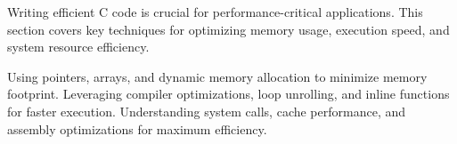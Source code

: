 \begin{comment}
9.5.1.2 Compiler-Driven Optimizations

9.5.2 Cache Alignment for Peak Performance

9.5.2.1 Memory Access and Predictability

9.5.2.2 Struct Packing Strategies

9.6 C17 and Beyond – Future Optimization Techniques
9.6.1 Link-Time Optimization (LTO)

9.6.1.1 Optimizing Across Multiple Source Files

9.6.1.2 Removing Unused Functions at Compile-Time

9.6.2 The Future of Low-Level Optimization

9.6.2.1 AI-Assisted Performance Profiling

9.6.2.2 Safer High-Performance Programming
\end{comment}

\begin{NxSBox}[][Optimization in C]
	\begin{NxIDBox}
		Writing efficient C code is crucial for performance-critical applications. This section covers key techniques for optimizing memory usage, execution speed, and system resource efficiency.
	\end{NxIDBox}
	\begin{NxIDBoxL}
		 Using pointers, arrays, and dynamic memory allocation to minimize memory footprint.
		 Leveraging compiler optimizations, loop unrolling, and inline functions for faster execution.
		 Understanding system calls, cache performance, and assembly optimizations for maximum efficiency.
	\end{NxIDBoxL}
\end{NxSBox}

